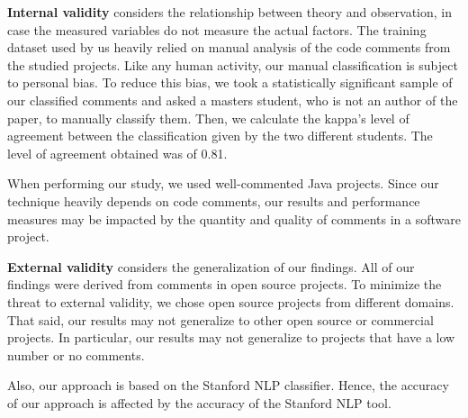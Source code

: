 \noindent\textbf{Internal validity} considers the relationship between theory and observation, in case the measured variables do not measure the actual factors. The training dataset used by us heavily relied on manual analysis of the code comments from the studied projects. Like any human activity, our manual classification is subject to personal bias. To reduce this bias, we took a statistically significant sample of our classified comments and asked a masters student, who is not an author of the paper, to manually classify them. Then, we calculate the kappa's level of agreement between the classification given by the two different students. The level of agreement obtained was of 0.81.  

When performing our study, we used well-commented Java projects. Since our technique heavily depends on code comments, our results and performance measures may be impacted by the quantity and quality of comments in a software project.  

\noindent \textbf{External validity} considers the generalization of our findings. All of our findings were derived from comments in open source projects. To minimize the threat to external validity, we chose open source projects from different domains. That said, our results may not generalize to other open source or commercial projects. In particular, our results may not generalize to projects that have a low number or no comments.

Also, our approach is based on the Stanford NLP classifier. Hence, the accuracy of our approach is affected by the accuracy of the Stanford NLP tool. 